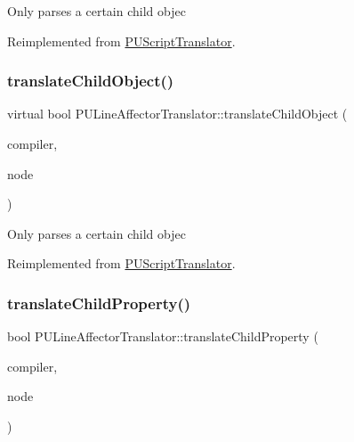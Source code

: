 Only parses a certain child objec 

Reimplemented from \hyperlink{classPUScriptTranslator_ab587d01348ae3e678cb700c719b2b113}{P\+U\+Script\+Translator}.

\mbox{\label{classPULineAffectorTranslator_a4b09d712656e78f489c65bda5e474448}} 
\subsubsection{\texorpdfstring{translate\+Child\+Object()}{translateChildObject()}\hspace{0.1cm}{\footnotesize\ttfamily [2/2]}}
{\footnotesize\ttfamily virtual bool P\+U\+Line\+Affector\+Translator\+::translate\+Child\+Object (\begin{DoxyParamCaption}\item[{\hyperlink{classPUScriptCompiler}{P\+U\+Script\+Compiler} $\ast$}]{compiler,  }\item[{\hyperlink{classPUAbstractNode}{P\+U\+Abstract\+Node} $\ast$}]{node }\end{DoxyParamCaption})\hspace{0.3cm}{\ttfamily [virtual]}}

Only parses a certain child objec 

Reimplemented from \hyperlink{classPUScriptTranslator_ab587d01348ae3e678cb700c719b2b113}{P\+U\+Script\+Translator}.

\mbox{\label{classPULineAffectorTranslator_a461d66e9164503f043fd5310f679b7a2}} 
\subsubsection{\texorpdfstring{translate\+Child\+Property()}{translateChildProperty()}\hspace{0.1cm}{\footnotesize\ttfamily [1/2]}}
{\footnotesize\ttfamily bool P\+U\+Line\+Affector\+Translator\+::translate\+Child\+Property (\begin{DoxyParamCaption}\item[{\hyperlink{classPUScriptCompiler}{P\+U\+Script\+Compiler} $\ast$}]{compiler,  }\item[{\hyperlink{classPUAbstractNode}{P\+U\+Abstract\+Node} $\ast$}]{node }\end{DoxyParamCaption})\hspace{0.3cm}{\ttfamily [virtual]}}

